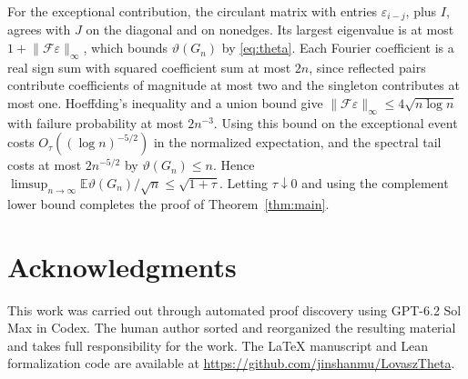 \documentclass[11pt,letterpaper]{article}
\newcommand{\E}{\mathbb E}
\newcommand{\norm}[1]{\lVert #1\rVert}
\begin{document}
For the exceptional contribution, the circulant matrix with entries
\(\varepsilon_{i-j}\), plus \(I\), agrees with \(J\) on the diagonal
and on nonedges. Its largest eigenvalue is at most
\(1+\norm{\mathcal F\varepsilon}_\infty\), which bounds
\(\vartheta(G_n)\) by \eqref{eq:theta}. Each Fourier coefficient is a
real sign sum with squared coefficient sum at most \(2n\), since
reflected pairs contribute coefficients of magnitude at most two
and the singleton contributes at most one. Hoeffding's inequality and a union
bound give \(\norm{\mathcal F\varepsilon}_\infty\le4\sqrt{n\log n}\)
with failure probability at most \(2n^{-3}\). Using this bound on the
exceptional event costs \(O_\tau((\log n)^{-5/2})\) in the normalized
expectation, and the spectral tail costs at most \(2n^{-5/2}\) by
\(\vartheta(G_n)\le n\). Hence
\(\limsup_{n\to\infty}\E\vartheta(G_n)/\sqrt n\le\sqrt{1+\tau}\).
Letting \(\tau\downarrow0\) and using the complement lower bound
completes the proof of Theorem~\ref{thm:main}.

\section*{Acknowledgments}

This work was carried out through automated proof discovery using
GPT-6.2 Sol Max in Codex. The human author sorted and reorganized the
resulting material and takes full responsibility for the work.
The \LaTeX{} manuscript and Lean formalization code are available at
\url{https://github.com/jinshanmu/LovaszTheta}.
\end{document}
